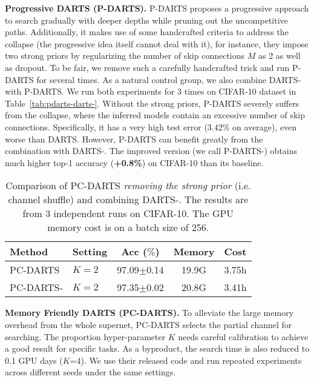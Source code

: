\documentclass{article} \usepackage{iclr2021_conference,times}
\begin{document}
\textbf{Progressive DARTS (P-DARTS).} P-DARTS \citep{chen2019progressive} proposes a progressive approach to search gradually with deeper depths while pruning out the uncompetitive paths. Additionally, it makes use of some handcrafted criteria to address the collapse (the progressive idea itself cannot deal with it), for instance, they impose two strong priors by regularizing the number of skip connections $M$ as 2 as well as dropout. To be fair, we remove such a carefully handcrafted trick and run P-DARTS for several times. As a natural control group, we also combine DARTS- with P-DARTS. We run both experiments for 3 times on CIFAR-10 dataset in Table~\ref{tab:pdarts-darts-}. Without the strong priors, P-DARTS severely suffers from the collapse, where the inferred models contain an excessive number of skip connections.  Specifically, it has a very high test error ($3.42\%$ on average), even worse than DARTS.  However, P-DARTS can benefit greatly from the combination with DARTS-. The improved version (we call P-DARTS-) obtains much higher top-1 accuracy (\textbf{+0.8\%}) on CIFAR-10 than its baseline.

\begin{wraptable}{r}{6.3cm}
	\vspace{-20pt}
	\setlength{\tabcolsep}{1pt}
	\small
	\centering
	\caption{Comparison of PC-DARTS \textit{removing the strong prior }(i.e. channel shuffle) and combining DARTS-. The results are from 3 independent runs on CIFAR-10. The GPU memory cost is on a batch size of 256.} 
	\smallskip\begin{tabular}{lp{1cm}ccc}
		\toprule
		\textbf{Method}&  \textbf{Setting} &  \textbf{Acc} ($\%$) & \textbf{Memory} & \textbf{Cost} \\
		\midrule
		PC-DARTS  & $K=2$ &   97.09$\pm$0.14 & 19.9G & 3.75h \\
		PC-DARTS-    &  $K=2$ & 97.35$\pm0.02$ & 20.8G & 3.41h \\
		\bottomrule
	\end{tabular}
	\label{tab:pcdarts-darts-}
	\vspace{-15pt}
\end{wraptable}

\textbf{Memory Friendly DARTS (PC-DARTS).}
To alleviate the large memory overhead from the whole supernet, PC-DARTS \citep{xu2020pcdarts} selects the partial channel for searching.  The proportion hyper-parameter $K$ needs careful calibration to achieve a good result for specific tasks.  As a  byproduct, the search time is also reduced to 0.1 GPU days ($K$=4).  We use their released code and run repeated experiments across different seeds under the same  settings. 
\end{document}
